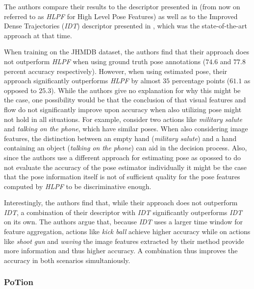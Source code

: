 The authors compare their results to the descriptor presented in  (from now on referred to as \textit{HLPF} for High Level Pose Features) as well as to the Improved Dense Trajectories (\textit{IDT}) descriptor presented in , which was the state-of-the-art approach at that time.

When training on the JHMDB dataset, the authors find that their approach does not outperform \textit{HLPF} when using ground truth pose annotations ($74.6$ and $77.8$ percent accuracy respectively).
However, when using estimated pose, their approach significantly outperforms \textit{HLPF} by almost $35$ percentage points ($61.1$ as opposed to $25.3$).
While the authors give no explanation for why this might be the case, one possibility would be that the conclusion of \cite{jhuang_towards_2013} that visual features and flow do not significantly improve upon accuracy when also utilizing pose might not hold in all situations.
For example, consider two actions like \textit{military salute} and \textit{talking on the phone}, which have similar poses.
When also considering image features, the distinction between an empty hand (\textit{military salute}) and a hand containing an object (\textit{talking on the phone}) can aid in the decision process.
Also, since the authors use a different approach for estimating pose as opossed to \cite{jhuang_towards_2013}  do not evaluate the accuracy of the pose estimator individually it might be the case that the pose information itself is not of sufficient quality for the pose features computed by \textit{HLPF} to be discriminative enough.

Interestingly, the authors find that, while their approach does not outperform \textit{IDT}, a combination of their descriptor with \textit{IDT} significantly outperforms \textit{IDT} on its own.
The authors argue that, because \textit{IDT} uses a larger time window for feature aggregation, actions like \textit{kick ball} achieve higher accuracy while on actions like \textit{shoot gun} and \textit{waving} the image features extracted by their method provide more information and thus higher accuracy.
A combination thus improves the accuracy in both scenarios simultaniously.

\subsubsection{PoTion}
\label{sec:potion}




